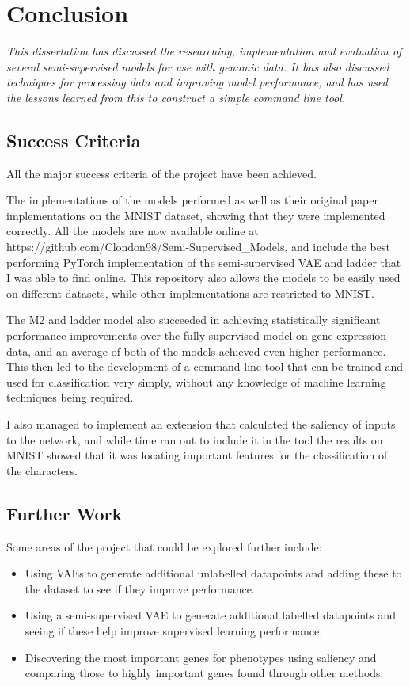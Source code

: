 \chapter{Conclusion}

\textit{This dissertation has discussed the researching, implementation and evaluation of several semi-supervised models for use with genomic
data. It has also discussed techniques for processing data and improving model performance, and has used the lessons learned from 
this to construct a simple command line tool.}

\section{Success Criteria}

All the major success criteria of the project have been achieved. 

The implementations of the models performed as well as their original paper implementations on the MNIST dataset, showing that they were 
implemented correctly. All the models are now available online at https://github.com/Clondon98/Semi-Supervised\_Models, and include the 
best performing PyTorch implementation of the semi-supervised VAE and ladder that I was able to find online. This repository also allows 
the models to be easily used on different datasets, while other implementations are restricted to MNIST. 

The M2 and ladder model also succeeded in achieving statistically significant performance improvements over the fully supervised model on 
gene expression data, and an average of both of the models achieved even higher performance. This then led to the development of a 
command line tool that can be trained and used for classification very simply, without any knowledge of machine learning techniques being 
required.

I also managed to implement an extension that calculated the saliency of inputs to the network, and while time ran out to include it in the 
tool the results on MNIST showed that it was locating important features for the classification of the characters.

\section{Further Work}

Some areas of the project that could be explored further include:
\begin{itemize}
    \item Using VAEs to generate additional unlabelled datapoints and adding these to the dataset to see if they improve performance.
    \item Using a semi-supervised VAE to generate additional labelled datapoints and seeing if these help improve supervised learning 
          performance.
    \item Discovering the most important genes for phenotypes using saliency and comparing those to highly important genes found through
          other methods.  
\end{itemize}

